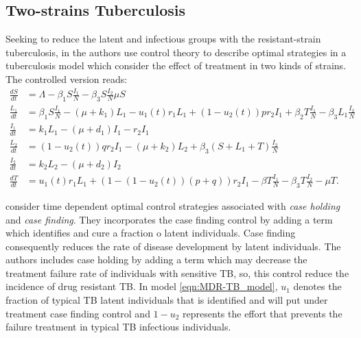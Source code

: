 \subsection*{Two-strains Tuberculosis}
Seeking to reduce the latent and infectious groups with the 
resistant-strain tuberculosis, in \cite{Lenhart2002} the authors  use 
control theory to describe optimal strategies in a tuberculosis model 
which consider the effect of treatment in two kinds of strains. The 
controlled version reads:
	\begin{equation}\label{eqn:MDR-TB_model}
	  \begin{aligned}
	    \frac{dS}{dt} &=
		    \Lambda - \beta_1 S \frac{I_1}{N} 
		    - \beta_3 S \frac{I_2}{N}
		    \mu S
		  \\
		  \frac{L_1}{dt} &=
			  \beta_1 S \frac{I_1}{N}
			  - (\mu + k_1) L_1
			  - u_1 (t) r_1 L_1
			  + (1 - u_2 (t)) p r_2 I_1
				+ \beta_2 T \frac{I_1}{N}
				- \beta_3 L_1 \frac{I_2}{N}
			\\
			\frac{I_1}{dt} &= 
				k_1 L_1
				- (\mu + d_1) I_1
				-r_2 I_1
			\\
			\frac{L_2}{dt} &=
				(1 - u_2(t)) q r_2 I_1
				- (\mu + k_2) L_2
				+ \beta_3 (S + L_1 + T) \frac{I_2}{N}
			\\
			\frac{I_2}{dt} &=
				k_2 L_2 - (\mu + d_2) I_2
			\\
			\frac{d T}{dt} &=
				u_1(t) r_1 L_1
				+ (1 - (1 - u_2(t))(p + q)) r_2 I_1
				- \beta T \frac{I_1}{N}
				- \beta_3 T \frac{I_2}{N}
				-\mu T.
	  \end{aligned}
	\end{equation}

	\citeauthor*{Lenhart2002} consider time dependent 
optimal control strategies associated with \emph{case holding} and 
\emph{case finding}. They incorporates the case finding control by adding a 
term which identifies and  cure a fraction o latent individuals. Case finding
consequently reduces the rate of disease development by latent individuals. The
authors includes case holding by adding a term which may decrease the treatment
failure rate of individuals with sensitive  TB, so, this control reduce the
incidence of drug resistant TB. In model \eqref{eqn:MDR-TB_model}, $u_1$ denotes
the fraction of typical TB latent individuals that is identified and will put
under treatment \textemdash case finding control \textemdash and $1 - u_2$
represents the effort that prevents the failure treatment in typical TB
infectious individuals.

